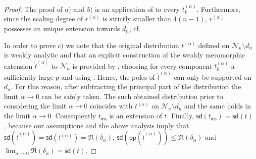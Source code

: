 \documentclass[10pt]{book}
\newcommand{\pp}{\mathsf{pp}}
\newcommand{\ms}{\mathsf{ms}}
\newcommand{\sd}{\mathsf{sd}}
\newcommand{\Ncal}{\mathcal{N}}
\theoremstyle{break}
\begin{document}
\begin{proof}
The proof of $a)$ and $b)$ is an application of %
to every $t^{(\alpha)}_k$. Furthermore, since the scaling degree of $r^{(\alpha)}$ is strictly smaller than $4(n-1)$, $r^{(\alpha)}$ possesses an unique extension towards $d_n$, cf. %

In order to prove $c)$ we note that the original distribution $t^{(\alpha)}$ defined on $\Ncal_n\setminus d_n$ is weakly analytic and that an explicit construction of the weakly meromorphic extension $\dot{t}^{(\alpha)}$ to $\Ncal_n$ is provided by 
, choosing for every component $t^{(\alpha)}_k$ a sufficiently large $p$ and using %
. Hence, the poles of $\dot{t}^{(\alpha)}$ can only be supported on $d_n$. For this reason, after subtracting the principal part of the distribution the limit $\alpha \to 0$ can be safely taken. The such obtained distribution prior to considering the limit $\alpha \to 0$ coincides with $t^{(\alpha)}$ on $\Ncal_n\setminus d_n$ and the same holds in the limit $\alpha\to 0$. Consequently $t_\ms$ is an extension of $t$. Finally, $\sd(t_\ms)=\sd(t)$, because our assumptions and the above analysis imply that $\sd(\dot{t}^{(\alpha)})=\sd(t^{(\alpha)})=\Re(\delta_\alpha)$, $\sd(\pp(\dot{t}^{(\alpha)}))\le \Re(\delta_\alpha)$ and $\lim_{\alpha\to 0}\Re(\delta_\alpha) = \sd(t)$.
\end{proof}
\end{document}
